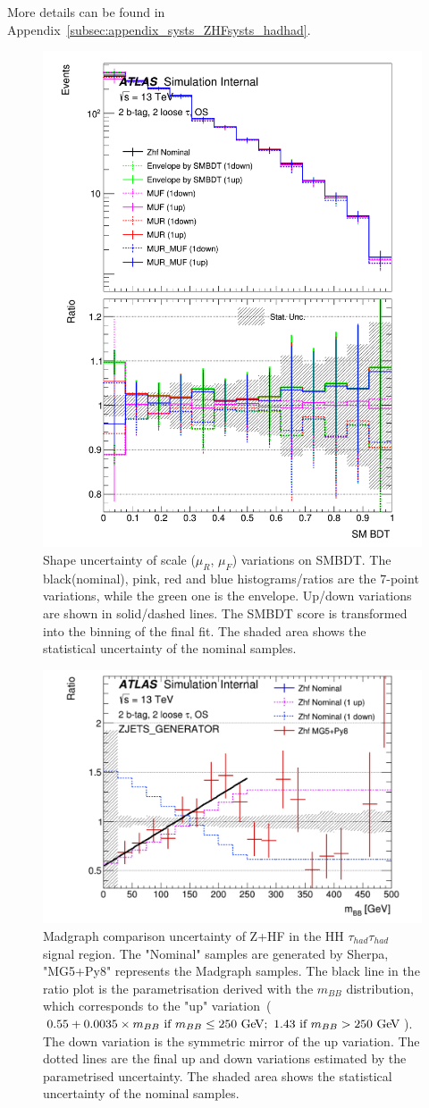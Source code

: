 More details can be found in Appendix~\ref{subsec:appendix_systs_ZHFsysts_hadhad}.

\begin{figure}[htbp]
    \centering
    \includegraphics[width=.45\textwidth]{figures/systs/hadhad_ZHF/2tag2pjet_0ptv_LL_OS_SMBDT_BDT_Scale.png}
    \caption{Shape uncertainty of scale ($\mu_R$, $\mu_F$) variations on SMBDT. The black(nominal), pink, red and blue histograms/ratios are the 7-point variations, while the green one is the envelope. Up/down variations are shown in solid/dashed lines. The SMBDT score is transformed into the binning of the final fit. The shaded area shows the statistical uncertainty of the nominal samples.}
    \label{fig:hadhad_ZHF_Scale_SMBDT}
\end{figure}

\begin{figure}[htbp]
    \centering
    \includegraphics[width=.45\textwidth]{figures/systs/hadhad_ZHF/2tag2pjet_0ptv_LL_OS_mBB_Presel}
    \caption{Madgraph comparison uncertainty of Z+HF in the HH $\tau_{had}\tau_{had}$ signal region. The "Nominal" samples are generated by Sherpa, "MG5+Py8" represents the Madgraph samples. The black line in the ratio plot is the parametrisation derived with the $m_{BB}$ distribution, which corresponds to the "up" variation~($0.55 + 0.0035 \times m_{BB}~\text{if}~m_{BB}\le 250~\text{Ge\kern -0.1em V};~1.43~\text{if}~m_{BB} > 250~\text{Ge\kern -0.1em V}$). The down variation is the symmetric mirror of the up variation. The dotted lines are the final up and down variations estimated by the parametrised uncertainty. The shaded area shows the statistical uncertainty of the nominal samples.}
    \label{fig:hadhad_ZHF_Madgraph_mBB}
\end{figure}

